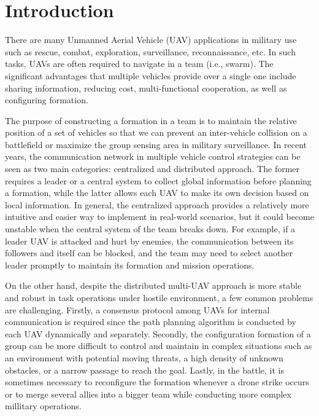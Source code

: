 \chapter{Introduction}


There are many Unmanned Aerial Vehicle (UAV) applications in military use such as rescue, combat, exploration, surveillance, reconnaissance, etc. In such tasks, UAVs are often required to navigate in a team (i.e., swarm). The significant advantages that multiple vehicles provide over a single one include sharing information, reducing cost, multi-functional cooperation, as well as configuring formation.

The purpose of constructing a formation in a team is to maintain the relative position of a set of vehicles so that we can prevent an inter-vehicle collision on a battlefield or maximize the group sensing area in military surveillance. In recent years, the communication network in multiple vehicle control strategies can be seen as two main categories: centralized and distributed approach. The former requires a leader or a central system to collect global information before planning a formation, while the latter allows each UAV to make its own decision based on local information. In general, the centralized approach provides a relatively more intuitive and easier way to implement in real-world scenarios, but it could become unstable when the central system of the team breaks down. For example, if a leader UAV is attacked and hurt by enemies, the communication between its followers and itself can be blocked, and the team may need to select another leader promptly to maintain its formation and mission operations.

On the other hand, despite the distributed multi-UAV approach is more stable and robust in task operations under hostile environment, a few common problems are challenging. Firstly, a consensus protocol among UAVs for internal communication is required since the path planning algorithm is conducted by each UAV dynamically and separately. Secondly, the configuration formation of a group can be more difficult to control and maintain in complex situations such as an environment with potential moving threats, a high density of unknown obstacles, or a narrow passage to reach the goal. Lastly, in the battle, it is sometimes necessary to reconfigure the formation whenever a drone strike occurs or to merge several allies into a bigger team while conducting more complex millitary operations. 

